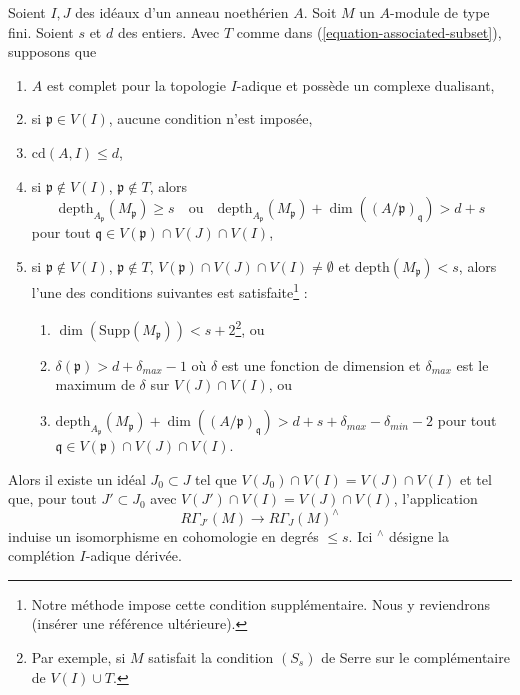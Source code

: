 \begin{lemma}
\label{lemma-algebraize-local-cohomology-general}
Soient $I, J$ des idéaux d'un anneau noethérien $A$.
Soit $M$ un $A$-module de type fini.
Soient $s$ et $d$ des entiers. Avec $T$ comme dans
(\ref{equation-associated-subset}), supposons que
\begin{enumerate}
\item $A$ est complet pour la topologie $I$-adique et possède un complexe dualisant,
\item si $\mathfrak p \in V(I)$, aucune condition n'est imposée,
\item $\text{cd}(A, I) \leq d$,
\item si $\mathfrak p \not \in V(I)$, $\mathfrak p \not \in T$, alors
$$
\text{depth}_{A_\mathfrak p}(M_\mathfrak p) \geq s
\quad\text{ou}\quad
\text{depth}_{A_\mathfrak p}(M_\mathfrak p) +
\dim((A/\mathfrak p)_\mathfrak q) > d + s
$$
pour tout $\mathfrak q \in V(\mathfrak p) \cap V(J) \cap V(I)$,
\item si $\mathfrak p \not \in V(I)$, $\mathfrak p \not \in T$,
$V(\mathfrak p) \cap V(J) \cap V(I) \not = \emptyset$ et
$\text{depth}(M_\mathfrak p) < s$, alors l'une
des conditions suivantes est satisfaite\footnote{Notre méthode
impose cette condition supplémentaire. Nous y reviendrons
(insérer une référence ultérieure).} :
\begin{enumerate}
\item $\dim(\text{Supp}(M_\mathfrak p)) < s + 2$\footnote{Par exemple,
si $M$ satisfait la condition $(S_s)$ de Serre
sur le complémentaire de $V(I) \cup T$.}, ou
\item  $\delta(\mathfrak p) > d + \delta_{max} - 1$
où $\delta$ est une fonction de dimension et $\delta_{max}$
est le maximum de $\delta$ sur $V(J) \cap V(I)$, ou
\item $\text{depth}_{A_\mathfrak p}(M_\mathfrak p) +
\dim((A/\mathfrak p)_\mathfrak q) > d + s + \delta_{max} - \delta_{min} - 2$
pour tout $\mathfrak q \in V(\mathfrak p) \cap V(J) \cap V(I)$.
\end{enumerate}
\end{enumerate}
Alors il existe un idéal $J_0 \subset J$ tel que
$V(J_0) \cap V(I) = V(J) \cap V(I)$
et tel que, pour tout $J' \subset J_0$ avec
$V(J') \cap V(I) = V(J) \cap V(I)$, l'application
$$
R\Gamma_{J'}(M) \longrightarrow R\Gamma_J(M)^\wedge
$$
induise un isomorphisme en cohomologie en degrés $\leq s$.
Ici ${}^\wedge$ désigne la complétion $I$-adique dérivée.
\end{lemma}

